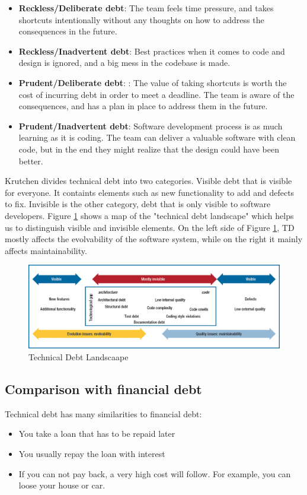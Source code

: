 \begin{itemize}
	\item \textbf{Reckless/Deliberate debt}: The team feels time pressure, and takes shortcuts intentionally without any thoughts on how to address the consequences in the future.
	\item \textbf{Reckless/Inadvertent debt}: Best practices when it comes to code and design is ignored, and a big mess in the codebase is made.
	\item \textbf{Prudent/Deliberate debt}: : The value of taking shortcuts is worth the cost of incurring debt in order to meet a deadline. The team is aware of the consequences, and has a plan in place to address them in the future. 
	\item \textbf{Prudent/Inadvertent debt}: Software development process is as much learning as it is coding. The team can deliver a valuable software with clean code, but in the end they might realize that the design could have been better.
\end{itemize}

Krutchen divides technical debt into two categories\cite{krutchen}. Visible debt that is visible for everyone. It containts elements such as new functionality to add and defects to fix. Invisible is the other category, debt that is only visible to software developers. Figure \ref{fig:techDebtLandscape} shows a map of the "technical debt landscape" which helps us to distinguish visible and invisible elements. On the left side of Figure \ref{fig:techDebtLandscape}, TD mostly affects the evolvability of the software system, while on the right it mainly affects maintainability.

\begin{figure}[ht!]
	\centering
	\includegraphics[width=1.0\textwidth]{images/techDebtLandscape.png}
	\caption{Technical Debt Landscaape}
	\label{fig:techDebtLandscape}
\end{figure}

\subsection{Comparison with financial debt}
Technical debt has many similarities to financial debt\cite{p50-allman,Zazworka:2011:PDD:1985362.1985372}:
\begin{itemize}
	\item You take a loan that has to be repaid later
	\item You usually repay the loan with interest
	\item If you can not pay back, a very high cost will follow. For example, you can loose your house or car.
\end{itemize}

